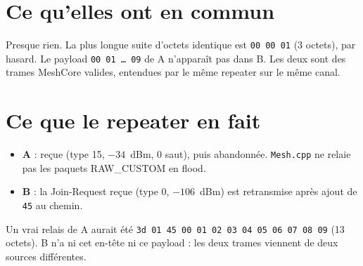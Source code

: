 \documentclass[11pt,a4paper]{article}
\begin{document}
\section*{Ce qu'elles ont en commun}

Presque rien. La plus longue suite d'octets identique est \texttt{00 00 01} (3 octets), par hasard.
Le payload \texttt{00 01 \ldots{} 09} de A n'apparaît pas dans B.
Les deux sont des trames MeshCore valides, entendues par le même repeater sur le même canal.

\section*{Ce que le repeater en fait}

\begin{itemize}
  \item \textbf{A} : reçue (type 15, $-34$~dBm, 0 saut), puis abandonnée. \texttt{Mesh.cpp} ne relaie pas les paquets RAW\_CUSTOM en flood.
  \item \textbf{B} : la Join-Request reçue (type 0, $-106$~dBm) est retransmise après ajout de \texttt{45} au chemin.
\end{itemize}

Un vrai relais de A aurait été \texttt{3d 01 45 00 01 02 03 04 05 06 07 08 09} (13 octets).
B n'a ni cet en-tête ni ce payload : les deux trames viennent de deux sources différentes.
\end{document}
